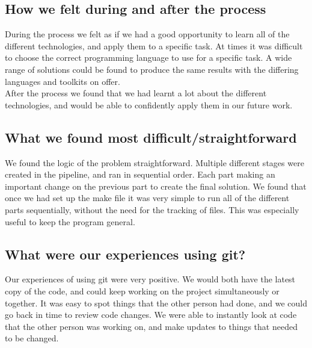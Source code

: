 \documentclass{article}
\begin{document}
\subsection*{How we felt during and after the process}

During the process we felt as if we had a good opportunity to learn all of the different technologies, and apply them to a specific task. At times it was difficult to choose the correct programming language to use for a specific task. A wide range of solutions could be found to produce the same results with the differing languages and toolkits on offer. \\

After the process we found that we had learnt a lot about the different technologies, and would be able to confidently apply them in our future work.

\subsection*{What we found most difficult/straightforward}

We found the logic of the problem straightforward. Multiple different stages were created in the pipeline, and ran in sequential order. Each part making an important change on the previous part to create the final solution. We found that once we had set up the make file it was very simple to run all of the different parts sequentially, without the need for the tracking of files. This was especially useful to keep the program general.

\subsection*{What were our experiences using git?}

Our experiences of using git were very positive. We would both have the latest copy of the code, and could keep working on the project simultaneously or together.  It was easy to spot things that the other person had done, and we could go back in time to review code changes. We were able to instantly look at code that the other person was working on, and make updates to things that needed to be changed.
\end{document}
